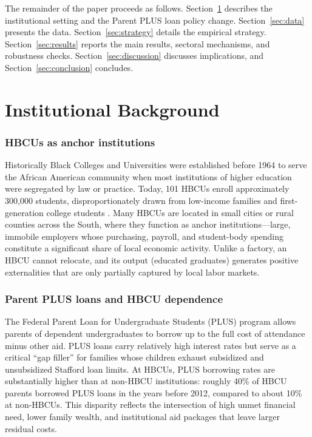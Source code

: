 \documentclass[12pt]{article}
\begin{document}
The remainder of the paper proceeds as follows. Section~\ref{sec:background} describes the institutional setting and the Parent PLUS loan policy change. Section~\ref{sec:data} presents the data. Section~\ref{sec:strategy} details the empirical strategy. Section~\ref{sec:results} reports the main results, sectoral mechanisms, and robustness checks. Section~\ref{sec:discussion} discusses implications, and Section~\ref{sec:conclusion} concludes.

\section{Institutional Background}
\label{sec:background}

\subsubsection*{HBCUs as anchor institutions} Historically Black Colleges and Universities were established before 1964 to serve the African American community when most institutions of higher education were segregated by law or practice. Today, 101 HBCUs enroll approximately 300{,}000 students, disproportionately drawn from low-income families and first-generation college students \citep{gasman2013}. Many HBCUs are located in small cities or rural counties across the South, where they function as anchor institutions---large, immobile employers whose purchasing, payroll, and student-body spending constitute a significant share of local economic activity. Unlike a factory, an HBCU cannot relocate, and its output (educated graduates) generates positive externalities that are only partially captured by local labor markets.

\subsubsection*{Parent PLUS loans and HBCU dependence} The Federal Parent Loan for Undergraduate Students (PLUS) program allows parents of dependent undergraduates to borrow up to the full cost of attendance minus other aid. PLUS loans carry relatively high interest rates but serve as a critical ``gap filler'' for families whose children exhaust subsidized and unsubsidized Stafford loan limits. At HBCUs, PLUS borrowing rates are substantially higher than at non-HBCU institutions: roughly 40\% of HBCU parents borrowed PLUS loans in the years before 2012, compared to about 10\% at non-HBCUs. This disparity reflects the intersection of high unmet financial need, lower family wealth, and institutional aid packages that leave larger residual costs.
\end{document}
